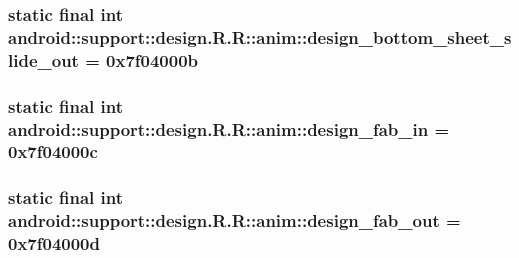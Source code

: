 \hypertarget{classandroid_1_1support_1_1design_1_1_r_1_1anim_14e891bd1f6408a71faf90750905742f}{
\subsubsection[{design\_\-bottom\_\-sheet\_\-slide\_\-out}]{\setlength{\rightskip}{0pt plus 5cm}static final int android::support::design.R.R::anim::design\_\-bottom\_\-sheet\_\-slide\_\-out = 0x7f04000b}}
\label{classandroid_1_1support_1_1design_1_1_r_1_1anim_14e891bd1f6408a71faf90750905742f}


\hypertarget{classandroid_1_1support_1_1design_1_1_r_1_1anim_0b64e4d0b9ae46ca7e55cfecbfb946f7}{
\subsubsection[{design\_\-fab\_\-in}]{\setlength{\rightskip}{0pt plus 5cm}static final int android::support::design.R.R::anim::design\_\-fab\_\-in = 0x7f04000c}}
\label{classandroid_1_1support_1_1design_1_1_r_1_1anim_0b64e4d0b9ae46ca7e55cfecbfb946f7}


\hypertarget{classandroid_1_1support_1_1design_1_1_r_1_1anim_e2cfeff71b0f26864d1822d93a8139df}{
\subsubsection[{design\_\-fab\_\-out}]{\setlength{\rightskip}{0pt plus 5cm}static final int android::support::design.R.R::anim::design\_\-fab\_\-out = 0x7f04000d}}
\label{classandroid_1_1support_1_1design_1_1_r_1_1anim_e2cfeff71b0f26864d1822d93a8139df}


